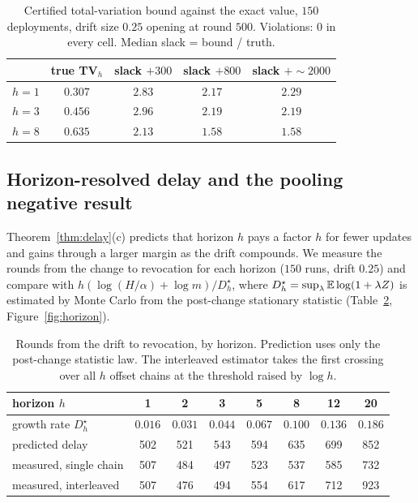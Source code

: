 \begin{table}[t]\centering
\caption{Certified total-variation bound against the exact value, $150$ deployments, drift size $0.25$ opening at round $500$. Violations: $0$ in every cell. Median slack = bound / truth.}
\label{tab:cert}
\small
\begin{tabular}{@{}lcccc@{}}
\toprule
 & true TV$_h$ & slack $+300$ & slack $+800$ & slack $+\sim2000$ \\
\midrule
$h=1$ & $0.307$ & $2.83$ & $2.17$ & $2.29$ \\
$h=3$ & $0.456$ & $2.96$ & $2.19$ & $2.19$ \\
$h=8$ & $0.635$ & $2.13$ & $1.58$ & $1.58$ \\
\bottomrule
\end{tabular}
\end{table}

\subsection{Horizon-resolved delay and the pooling negative result}\label{sec:exp-horizon}

Theorem~\ref{thm:delay}(c) predicts that horizon $h$ pays a factor $h$ for fewer updates and gains through a larger margin as the drift compounds. We measure the rounds from the change to revocation for each horizon
($150$ runs, drift $0.25$) and compare with $h(\log(H/\alpha)+\log m)/D^\star_h$, where $D^\star_h=\sup_\lambda\mathbb{E}\log(1+\lambda Z)$ is estimated by Monte Carlo from the post-change stationary statistic (Table~\ref{tab:horizon}, Figure~\ref{fig:horizon}).

\begin{table}[t]\centering
\caption{Rounds from the drift to revocation, by horizon. Prediction uses only the post-change statistic law. The interleaved estimator takes the first crossing over all $h$ offset chains at the threshold raised by $\log h$.}
\label{tab:horizon}
\small
\begin{tabular}{@{}lccccccc@{}}
\toprule
horizon $h$ & 1 & 2 & 3 & 5 & 8 & 12 & 20 \\
\midrule
growth rate $D^\star_h$ & $0.016$ & $0.031$ & $0.044$ & $0.067$ & $0.100$ & $0.136$ & $0.186$ \\
predicted delay & 502 & 521 & 543 & 594 & 635 & 699 & 852 \\
measured, single chain & 507 & 484 & 497 & 523 & 537 & 585 & 732 \\
measured, interleaved & 507 & 476 & 494 & 554 & 617 & 712 & 923 \\
\bottomrule
\end{tabular}
\end{table}

